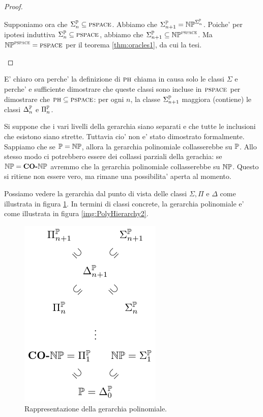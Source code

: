 \begin{proof}
\begin{itemize}
            Supponiamo ora che $\Sigma_{n}^{\mathbb{P}} \subseteq \textsc{pspace}$. Abbiamo che $\Sigma_{n+1}^{\mathbb{P}} =
            \mathbb{NP}^{\Sigma_{n}^{\mathbb{P}}}$. Poiche' per ipotesi induttiva $\Sigma_{n}^{\mathbb{P}} \subseteq
            \textsc{pspace}$, abbiamo che $\Sigma_{n+1}^{\mathbb{P}} \subseteq \mathbb{NP}^{\textsc{pspace}}$. Ma
            $\mathbb{NP}^{\textsc{pspace}} =
            \textsc{pspace}$ per il teorema \ref{thm:oracles1}, da cui la tesi.
    \end{itemize}
\end{proof}

E' chiaro ora perche' la definizione di $\textsc{ph}$ chiama in causa solo le classi $\Sigma$ e perche' e
sufficiente dimostrare che queste classi sono incluse in $\textsc{pspace}$ per dimostrare che $\textsc{ph} \subseteq
\textsc{pspace}$: per ogni $n$, la classe $\Sigma_{n+1}^{\mathbb{P}}$ maggiora (contiene) le classi $\Delta_{n}^{\mathbb{P}}$
e $\Pi_{n}^{\mathbb{P}}$.

Si suppone che i vari livelli della gerarchia siano separati e che tutte le inclusioni che esistono
siano strette. Tuttavia cio' non e' stato dimostrato formalmente. Sappiamo che se $\mathbb{P} =
\mathbb{NP}$, allora la gerarchia polinomiale collasserebbe su $\mathbb{P}$. Allo stesso modo ci
potrebbero essere dei collassi parziali della gerachia: se $\mathbb{NP}=\textbf{CO-}\mathbb{NP}$ avremmo che la gerarchia
polinomiale collasserebbe su $\mathbb{NP}$. Questo si ritiene non essere vero, ma rimane una
possibilita' aperta al momento.

Possiamo vedere la gerarchia dal punto di vista delle classi $\Sigma,\Pi$ e $\Delta$ come illustrata
in figura \ref{img:PolyHierarchy1}. In termini di classi concrete, la gerarchia polinomiale e' come
illustrata in figura \ref{img:PolyHierarchy2}.

\begin{figure}[h]
    \begin{center}
        \includegraphics{./img/oracles/PolyHierarchy1.pdf}
        \caption{Rappresentazione della gerarchia polinomiale.}
        \label{img:PolyHierarchy1}
    \end{center}
\end{figure}

